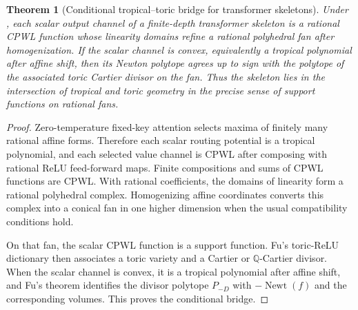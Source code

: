 \documentclass[11pt]{article}
\newtheorem{theorem}{Theorem}[section]
\DeclareMathOperator{\Newt}{Newt}
\newcommand{\Q}{\mathbb{Q}}
\begin{document}
\begin{theorem}[Conditional tropical--toric bridge for transformer skeletons]
\label{thm:conditional-toric}
Under , each scalar output channel of a finite-depth transformer skeleton is a rational CPWL function whose linearity domains refine a rational polyhedral fan after homogenization.  If the scalar channel is convex, equivalently a tropical polynomial after affine shift, then its Newton polytope agrees up to sign with the polytope of the associated toric Cartier divisor on the fan.  Thus the skeleton lies in the intersection of tropical and toric geometry in the precise sense of support functions on rational fans.
\end{theorem}

\begin{proof}
Zero-temperature fixed-key attention selects maxima of finitely many rational affine forms.  Therefore each scalar routing potential is a tropical polynomial, and each selected value channel is CPWL after composing with rational ReLU feed-forward maps.  Finite compositions and sums of CPWL functions are CPWL.  With rational coefficients, the domains of linearity form a rational polyhedral complex.  Homogenizing affine coordinates converts this complex into a conical fan in one higher dimension when the usual compatibility conditions hold.

On that fan, the scalar CPWL function is a support function.  Fu's toric-ReLU dictionary then associates a toric variety and a Cartier or $\Q$-Cartier divisor.  When the scalar channel is convex, it is a tropical polynomial after affine shift, and Fu's theorem identifies the divisor polytope $P_{-D}$ with $-\Newt(f)$ and the corresponding volumes.  This proves the conditional bridge.
\end{proof}
\end{document}

